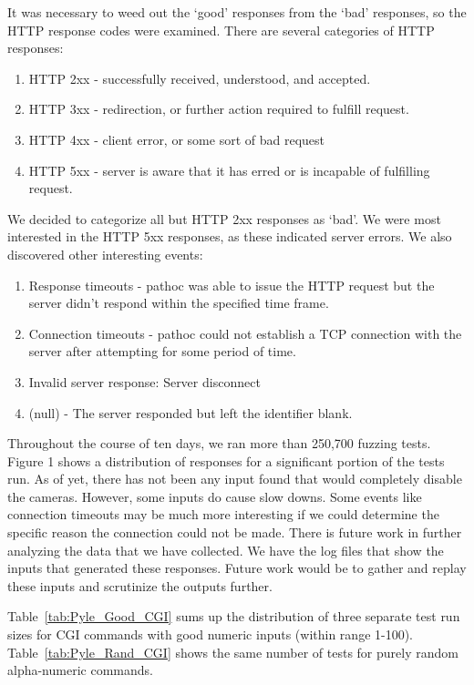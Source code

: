 \documentclass[letterpaper,twocolumn,10pt]{article}
\begin{document}
It was necessary to weed out the `good' responses from the `bad' responses, so the HTTP response codes were examined. There are several categories of HTTP responses: 
\begin{enumerate}
\item HTTP 2xx - successfully received, understood, and accepted.
\item HTTP 3xx - redirection, or further action required to fulfill request.
\item HTTP 4xx - client error, or some sort of bad request
\item HTTP 5xx - server is aware that it has erred or is incapable of fulfilling request.
\end{enumerate}
We decided to categorize all but HTTP 2xx responses as `bad'. We were most interested in the HTTP 5xx responses, as these indicated server errors. We also discovered other interesting events:
\begin{enumerate}
	\item Response timeouts - pathoc was able to issue the HTTP request but the server didn't respond within the specified time frame.
	\item Connection timeouts - pathoc could not establish a TCP connection with the server after attempting for some period of time.
	\item Invalid server response: Server disconnect
	\item (null) - The server responded but left the identifier blank.
\end{enumerate}


Throughout the course of ten days, we ran more than 250,700 fuzzing tests. Figure 1 shows a distribution of responses for a significant portion of the tests run. As of yet, there has not been any input found that would completely disable the cameras. However, some inputs do cause slow downs. Some events like connection timeouts may be much more interesting if we could determine the specific reason the connection could not be made. There is future work in further analyzing the data that we have collected. We have the log files that show the inputs that generated these responses. Future work would be to gather and replay these inputs and scrutinize the outputs further. 

Table~\ref{tab:Pyle_Good_CGI} sums up the distribution of three separate test run sizes for CGI commands with good numeric inputs (within range 1-100). Table~\ref{tab:Pyle_Rand_CGI} shows the same number of tests for purely random alpha-numeric commands.
\end{document}
